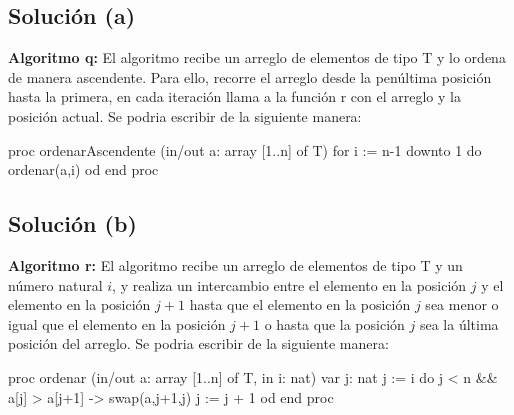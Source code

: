 \documentclass{article}
\begin{document}
\subsection{Solución (a)}
\textbf{Algoritmo q:} El algoritmo recibe un arreglo de elementos de tipo T y lo ordena de manera ascendente. Para ello, recorre el arreglo desde la penúltima posición hasta la primera, en cada iteración llama a la función r con el arreglo y la posición actual.
Se podria escribir de la siguiente manera:

\begin{codebox}
\begin{pascallike}
proc ordenarAscendente (in/out a: array [1..n] of T)
    for i := n-1 downto 1 do
    ordenar(a,i)
    od
end proc
\end{pascallike}
\end{codebox}

\subsection{Solución (b)}
\textbf{Algoritmo r:} El algoritmo recibe un arreglo de elementos de tipo T y un número natural $i$, y realiza un intercambio entre el elemento en la posición $j$ y el elemento en la posición $j+1$ hasta que el elemento en la posición $j$ sea menor o igual que el elemento en la posición $j+1$ o hasta que la posición $j$ sea la última posición del arreglo.
Se podria escribir de la siguiente manera:

\begin{codebox}
\begin{pascallike}
proc ordenar (in/out a: array [1..n] of T, in i: nat)
    var j: nat
    j := i
    do j < n && a[j] > a[j+1] ->
    swap(a,j+1,j)
    j := j + 1
    od
end proc
\end{pascallike}
\end{codebox}
\end{document}
